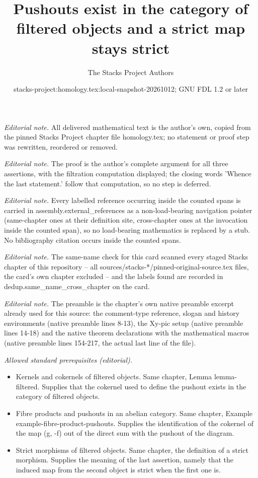 \documentclass[10pt,a4paper]{amsart}
\title{Pushouts exist in the category of filtered objects and a strict map stays strict}
\author{The Stacks Project Authors}
\date{stacks-project:homology.tex:local-snapshot-20261012; GNU FDL 1.2 or later}
\theoremstyle{plain}
\theoremstyle{definition}
\theoremstyle{remark}
\numberwithin{equation}{subsection}
\begin{document}
\maketitle
\noindent\textit{Editorial note.} All delivered mathematical text is the author's own, copied from the pinned Stacks Project chapter file homology.tex; no statement or proof step was rewritten, reordered or removed.\par\medskip
\noindent\textit{Editorial note.} The proof is the author's complete argument for all three assertions, with the filtration computation displayed; the closing words 'Whence the last statement.' follow that computation, so no step is deferred.\par\medskip
\noindent\textit{Editorial note.} Every labelled reference occurring inside the counted spans is carried in assembly.external\_references as a non-load-bearing navigation pointer (same-chapter ones at their definition site, cross-chapter ones at the invocation inside the counted span), so no load-bearing mathematics is replaced by a stub. No bibliography citation occurs inside the counted spans.\par\medskip
\noindent\textit{Editorial note.} The same-name check for this card scanned every staged Stacks chapter of this repository -- all sources/stacks-*/pinned-original-source.tex files, the card's own chapter excluded -- and the labels found are recorded in dedup.same\_name\_cross\_chapter on the card.\par\medskip
\noindent\textit{Editorial note.} The preamble is the chapter's own native preamble excerpt already used for this source: the comment-type reference, slogan and history environments (native preamble lines 8-13), the Xy-pic setup (native preamble lines 14-18) and the native theorem declarations with the mathematical macros (native preamble lines 154-217, the actual last line of the file).\par\medskip
\noindent\textit{Allowed standard prerequisites (editorial).}\begin{itemize}
\item Kernels and cokernels of filtered objects. Same chapter, Lemma lemma-filtered. Supplies that the cokernel used to define the pushout exists in the category of filtered objects.
\item Fibre products and pushouts in an abelian category. Same chapter, Example example-fibre-product-pushouts. Supplies the identification of the cokernel of the map (g, -f) out of the direct sum with the pushout of the diagram.
\item Strict morphisms of filtered objects. Same chapter, the definition of a strict morphism. Supplies the meaning of the last assertion, namely that the induced map from the second object is strict when the first one is.
\end{itemize}\medskip
\end{document}
